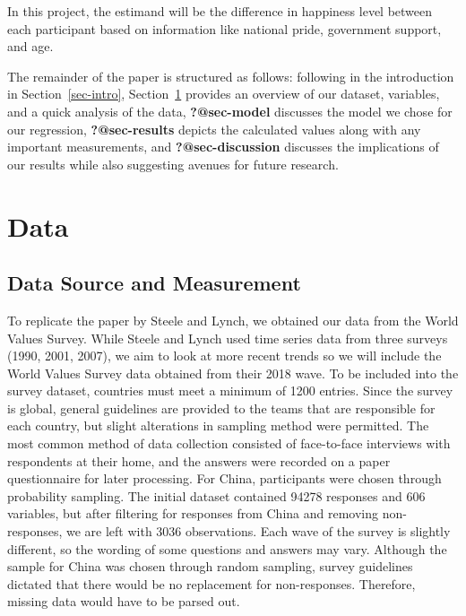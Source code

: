 \documentclass[
  letterpaper,
  DIV=11,
  numbers=noendperiod]{scrartcl}
\begin{document}
In this project, the estimand will be the difference in happiness level
between each participant based on information like national pride,
government support, and age.

The remainder of the paper is structured as follows: following in the
introduction in Section~\ref{sec-intro}, Section~\ref{sec-data} provides
an overview of our dataset, variables, and a quick analysis of the data,
\textbf{?@sec-model} discusses the model we chose for our regression,
\textbf{?@sec-results} depicts the calculated values along with any
important measurements, and \textbf{?@sec-discussion} discusses the
implications of our results while also suggesting avenues for future
research.

\hypertarget{sec-data}{%
\section{Data}\label{sec-data}}

\hypertarget{data-source-and-measurement}{%
\subsection{Data Source and
Measurement}\label{data-source-and-measurement}}

To replicate the paper by Steele and Lynch, we obtained our data from
the World Values Survey. While Steele and Lynch used time series data
from three surveys (1990, 2001, 2007), we aim to look at more recent
trends so we will include the World Values Survey data obtained from
their 2018 wave. To be included into the survey dataset, countries must
meet a minimum of 1200 entries. Since the survey is global, general
guidelines are provided to the teams that are responsible for each
country, but slight alterations in sampling method were permitted. The
most common method of data collection consisted of face-to-face
interviews with respondents at their home, and the answers were recorded
on a paper questionnaire for later processing. For China, participants
were chosen through probability sampling. The initial dataset contained
94278 responses and 606 variables, but after filtering for responses
from China and removing non-responses, we are left with 3036
observations. Each wave of the survey is slightly different, so the
wording of some questions and answers may vary. Although the sample for
China was chosen through random sampling, survey guidelines dictated
that there would be no replacement for non-responses. Therefore, missing
data would have to be parsed out.
\end{document}

